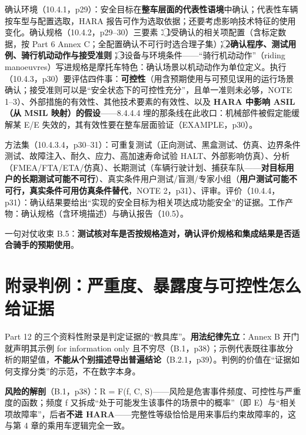 确认环境（10.4.1，p29）：安全目标在\textbf{整车层面的代表性语境}中确认；代表性车辆按车型与配置选取，HARA 报告可作为选取依据；还要考虑影响技术特征的使用变化。确认规格（10.4.2，p29–30）三要素：\textcircled{\scriptsize 1}受确认的相关项配置（含标定数据，按 Part 6 Annex C；全配置确认不可行时选合理子集）；\textcircled{\scriptsize 2}\textbf{确认程序、测试用例、骑行机动动作与接受准则}；\textcircled{\scriptsize 3}设备与环境条件——“骑行机动动作”（riding manoeuvres）写进规格是摩托车特色：确认场景以机动动作为单位定义。执行（10.4.3，p30）要评估四件事：\textbf{可控性}（用含预期使用与可预见误用的运行场景确认；接受准则可以是“安全状态下的可控性充分”，且单一准则未必够，NOTE 1–3）、外部措施的有效性、其他技术要素的有效性、以及 \textbf{HARA 中影响 ASIL（从 MSIL 映射）的假设}——8.4.4.4 埋的那条线在此收口：机械部件被假定能缓解某 E/E 失效的，其有效性要在整车层面验证（EXAMPLE，p30）。

方法集（10.4.3.4，p30–31）：可重复测试（正向测试、黑盒测试、仿真、边界条件测试、故障注入、耐久、应力、高加速寿命试验 HALT、外部影响仿真）、分析（FMEA/FTA/ETA/仿真）、长期测试（车辆行驶计划、捕获车队——\textbf{对目标用户的长期测试可能不可行}）、真实条件用户测试/盲测/专家小组（\textbf{用户测试可能不可行，真实条件可用仿真条件替代}，NOTE 2，p31）、评审。评价（10.4.4，p31）：确认结果要给出“实现的安全目标为相关项达成功能安全”的证据。工作产物：确认规格（含环境描述）与确认报告（10.5）。

一句对仗收束 B.5：\textbf{测试核对车是否按规格造对，确认评价规格和集成结果是否适合骑手的预期使用}。

\section{附录判例：严重度、暴露度与可控性怎么给证据}

Part 12 的三个资料性附录是判定证据的“教具库”。\textbf{用法纪律先立}：Annex B 开门就声明其示例 for information only 且不穷尽（B.1，p38）；示例代表既往事故分析的期望值，\textbf{不能从个别描述导出普遍结论}（B.2.1，p39）。判例的价值在“证据如何支撑分类”的示范，不在数字本身。

\textbf{风险的解剖}（B.1，p38）：R = F(f, C, S)——风险是危害事件频度、可控性与严重度的函数；频度 f 又拆成“处于可能发生该事件的场景中的概率”（即 E）与“相关项故障率”，后者\textbf{不进 HARA}——完整性等级恰恰是用来事后约束故障率的，这与第 4 章的乘用车逻辑完全一致。

